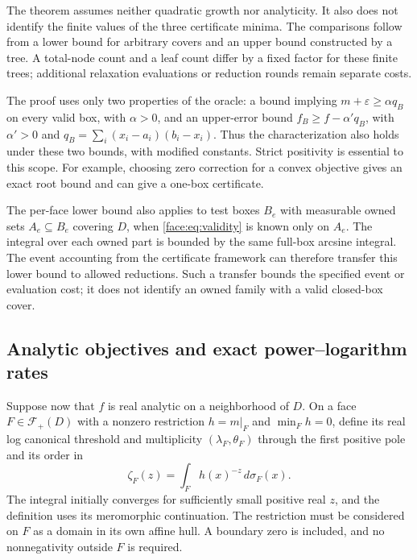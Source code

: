 The theorem assumes neither quadratic growth nor analyticity.  It also
does not identify the finite values of the three certificate minima.
The comparisons follow from a lower bound for arbitrary covers and an
upper bound constructed by a tree.  A total-node count and a leaf count
differ by a fixed factor for these finite trees; additional relaxation
evaluations or reduction rounds remain separate costs.

\begin{remark}
 \label{face:rem:gap-scope}
The proof uses only two properties of the oracle: a bound implying
$m+\varepsilon\ge\alpha q_B$ on every valid box, with $\alpha>0$, and
an upper-error bound $f_B\ge f-\alpha' q_B$, with $\alpha'>0$ and
$q_B=\sum_i(x_i-a_i)(b_i-x_i)$.  Thus the characterization also holds
under these two bounds, with modified constants.  Strict positivity is
essential to this scope.  For example, choosing zero correction for a
convex objective gives an exact root bound and can give a one-box
certificate.

The per-face lower bound also applies to test boxes $B_e$ with measurable
owned sets $A_e\subseteq B_e$ covering $D$, when
\eqref{face:eq:validity} is known only on $A_e$.  The integral over each
owned part is bounded by the same full-box arcsine integral.  The event
accounting from the certificate framework can therefore transfer this
lower bound to allowed reductions.  Such a transfer bounds the specified
event or evaluation cost; it does not identify an owned family with a
valid closed-box cover.
\end{remark}

\subsection{Analytic objectives and exact power--logarithm rates}

Suppose now that $f$ is real analytic on a neighborhood of $D$.  On a
face $F\in\mathcal F_+(D)$ with a nonzero restriction
$h=m|_F$ and $\min_Fh=0$, define its real log canonical threshold and
multiplicity $(\lambda_F,\theta_F)$ through the first positive pole and
its order in
\begin{equation}
 \label{face:eq:zeta}
 \zeta_F(z)=\int_F h(x)^{-z}\,d\sigma_F(x).
\end{equation}
The integral initially converges for sufficiently small positive real
$z$, and the definition uses its meromorphic continuation.  The
restriction must be considered on $F$ as a domain in its own affine
hull.  A boundary zero is included, and no nonnegativity outside $F$ is
required.

